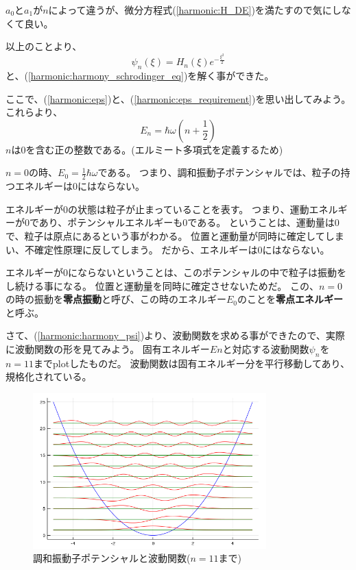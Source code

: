 $a_0$と$a_1$が$n$によって違うが、微分方程式(\ref{harmonic:H_DE})を満たすので気にしなくて良い。

以上のことより、
\begin{equation}
  \label{harmonic:harmony_psi}
  \psi_n(\xi) = H_n(\xi)e^{-\frac{\xi^2}{2}}
\end{equation}
と、(\ref{harmonic:harmony_schrodinger_eq})を解く事ができた。

ここで、(\ref{harmonic:eps})と、(\ref{harmonic:eps_requirement})を思い出してみよう。
これらより、
\begin{equation}
  E_n = \hbar\omega(n+\frac{1}{2})
\end{equation}
$n$は$0$を含む正の整数である。(エルミート多項式を定義するため)

$n = 0$の時、$E_0 = \frac{1}{2}\hbar\omega$である。
つまり、調和振動子ポテンシャルでは、粒子の持つエネルギーは$0$にはならない。

エネルギーが$0$の状態は粒子が止まっていることを表す。
つまり、運動エネルギーが$0$であり、ポテンシャルエネルギーも$0$である。
ということは、運動量は$0$で、粒子は原点にあるという事がわかる。
位置と運動量が同時に確定してしまい、不確定性原理に反してしまう。
だから、エネルギーは$0$にはならない。

エネルギーが$0$にならないということは、このポテンシャルの中で粒子は振動をし続ける事になる。
位置と運動量を同時に確定させないためだ。
この、$n=0$の時の振動を{\bf 零点振動}と呼び、この時のエネルギー$E_0$のことを{\bf 零点エネルギー}と呼ぶ。

さて、(\ref{harmonic:harmony_psi})より、波動関数を求める事ができたので、実際に波動関数の形を見てみよう。
固有エネルギー$En$と対応する波動関数$\psi_n$を$n=11$までplotしたものだ。
波動関数は固有エネルギー分を平行移動してあり、規格化されている。
\begin{figure}[htb]
  \begin{center}
    \includegraphics[height=6cm]{../fig/harmony.png}
    \caption{調和振動子ポテンシャルと波動関数($n=11$まで)}
    \label{}
  \end{center}
\end{figure}

